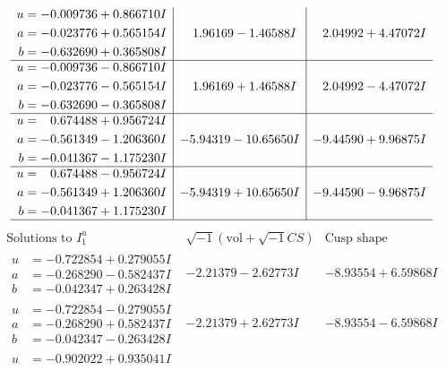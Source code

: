 \documentclass[1p]{elsarticle_modified}
\theoremstyle{definition}
\newcommand{\I}{\sqrt{-1}}
\begin{document}
$$\begin{array}{c|c|c}
\begin{aligned}
u &= -0.009736 + 0.866710 I \\
a &= -0.023776 + 0.565154 I \\
b &= -0.632690 + 0.365808 I\end{aligned}
 & \phantom{-}1.96169 - 1.46588 I & \phantom{-}2.04992 + 4.47072 I \\ \hline\begin{aligned}
u &= -0.009736 - 0.866710 I \\
a &= -0.023776 - 0.565154 I \\
b &= -0.632690 - 0.365808 I\end{aligned}
 & \phantom{-}1.96169 + 1.46588 I & \phantom{-}2.04992 - 4.47072 I \\ \hline\begin{aligned}
u &= \phantom{-}0.674488 + 0.956724 I \\
a &= -0.561349 - 1.206360 I \\
b &= -0.041367 - 1.175230 I\end{aligned}
 & -5.94319 - 10.65650 I & -9.44590 + 9.96875 I \\ \hline\begin{aligned}
u &= \phantom{-}0.674488 - 0.956724 I \\
a &= -0.561349 + 1.206360 I \\
b &= -0.041367 + 1.175230 I\end{aligned}
 & -5.94319 + 10.65650 I & -9.44590 - 9.96875 I\\
 \hline 
 \end{array}$$\newpage$$\begin{array}{c|c|c}  
\text{Solutions to }I^u_{1}& \I (\text{vol} + \sqrt{-1}CS) & \text{Cusp shape}\\
 \hline 
\begin{aligned}
u &= -0.722854 + 0.279055 I \\
a &= -0.268290 - 0.582437 I \\
b &= -0.042347 + 0.263428 I\end{aligned}
 & -2.21379 - 2.62773 I & -8.93554 + 6.59868 I \\ \hline\begin{aligned}
u &= -0.722854 - 0.279055 I \\
a &= -0.268290 + 0.582437 I \\
b &= -0.042347 - 0.263428 I\end{aligned}
 & -2.21379 + 2.62773 I & -8.93554 - 6.59868 I \\ \hline\begin{aligned}
u &= -0.902022 + 0.935041 I \\

\end{aligned}
\end{array}$$
\end{document}
